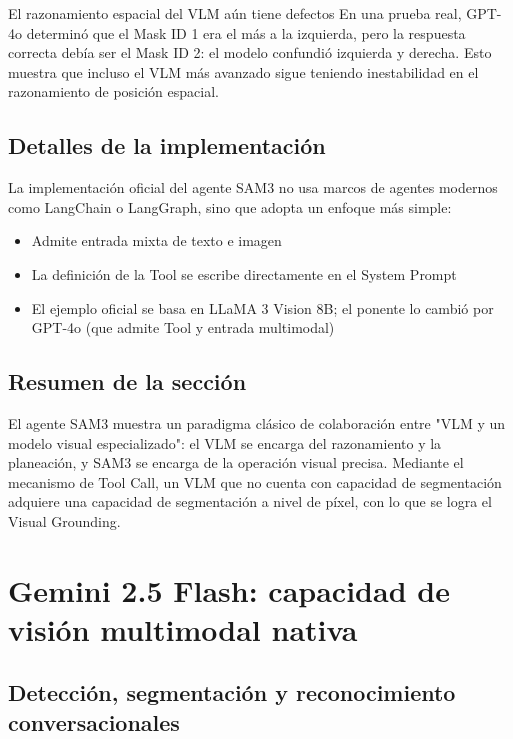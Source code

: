 \documentclass[a4paper]{article}
\begin{document}
\begin{warningbox}{El razonamiento espacial del VLM aún tiene defectos}
En una prueba real, GPT-4o determinó que el Mask ID 1 era el más a la izquierda, pero la respuesta correcta debía ser el Mask ID 2: el modelo confundió izquierda y derecha. Esto muestra que incluso el VLM más avanzado sigue teniendo inestabilidad en el razonamiento de posición espacial.
\end{warningbox}

\subsection{Detalles de la implementación}

La implementación oficial del agente SAM3 no usa marcos de agentes modernos como LangChain o LangGraph, sino que adopta un enfoque más simple:

\begin{itemize}
    \item Admite entrada mixta de texto e imagen
    \item La definición de la Tool se escribe directamente en el System Prompt
    \item El ejemplo oficial se basa en LLaMA 3 Vision 8B; el ponente lo cambió por GPT-4o (que admite Tool y entrada multimodal)
\end{itemize}

\subsection{Resumen de la sección}

El agente SAM3 muestra un paradigma clásico de colaboración entre "VLM y un modelo visual especializado": el VLM se encarga del razonamiento y la planeación, y SAM3 se encarga de la operación visual precisa. Mediante el mecanismo de Tool Call, un VLM que no cuenta con capacidad de segmentación adquiere una capacidad de segmentación a nivel de píxel, con lo que se logra el Visual Grounding.
\section{Gemini 2.5 Flash: capacidad de visión multimodal nativa}

\subsection{Detección, segmentación y reconocimiento conversacionales}
\end{document}
